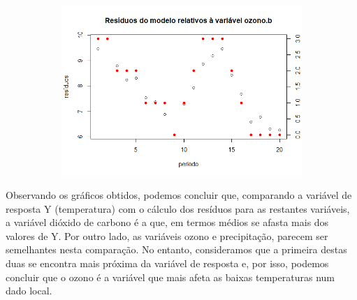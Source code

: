 \documentclass{article}
\begin{document}
\begin{figure}[!h]
\begin{subfigure}[b]{0.6\textwidth}
 					 \end{subfigure}
 					 \begin{subfigure}[b]{0.6\textwidth}
   						 \includegraphics[width=\textwidth]{residuosOzono}
 					 \end{subfigure}
 				\end{figure}
 				
 				Observando os gráficos obtidos, podemos concluir que, comparando a variável de resposta Y (temperatura) com o cálculo dos resíduos para as restantes variáveis, a variável dióxido de carbono é a que, em termos médios se afasta mais dos valores de Y. Por outro lado, as variáveis ozono e precipitação, parecem ser semelhantes nesta comparação. No entanto, consideramos que a primeira destas duas se encontra mais próxima da variável de resposta e, por isso, podemos concluir que o ozono é a variável que mais afeta as baixas temperaturas num dado local.			
			
\end{document}
